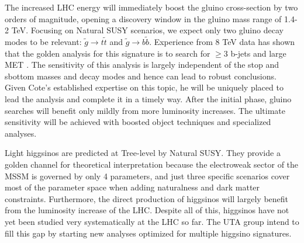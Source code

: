 The increased LHC energy will immediately boost the gluino
cross-section by two orders of magnitude, opening a discovery window in the 
gluino mass range of 1.4-2 TeV. Focusing on Natural SUSY scenarios, we expect
only two gluino decay modes to be relevant: 
$\tilde{g}\rightarrow t\tilde{t}$ and $\tilde{g}\rightarrow b\tilde{b}$.
Experience from 8 TeV data has shown that the golden analysis for this
signature is to search for $\geq$3 b-jets and large MET \cite{ThreeB}.
The sensitivity of this analysis is largely
independent of the stop and sbottom masses and decay modes and hence can lead to robust conclusions.
Given Cote's established expertise on this topic, he will be uniquely
placed to lead the analysis and complete it in a timely way.  After
the initial phase, gluino searches will benefit only mildly from more
luminosity increases.  The ultimate sensitivity will be achieved with
boosted object techniques and specialized analyses.

 Light higgsinos are predicted at
Tree-level by Natural SUSY. They provide a golden channel for
theoretical interpretation because the electroweak sector of the MSSM
is governed by only 4 parameters, and just three specific scenarios
cover most of the parameter space when adding naturalness and dark
matter constraints.  Furthermore, the direct production of
higgsinos %
will largely benefit from the luminosity increase of the LHC.  Despite
all of this, higgsinos have not yet been studied very systematically
at the LHC so far.  The UTA group intend to fill this gap by starting
new analyses optimized for multiple higgsino
signatures. %

